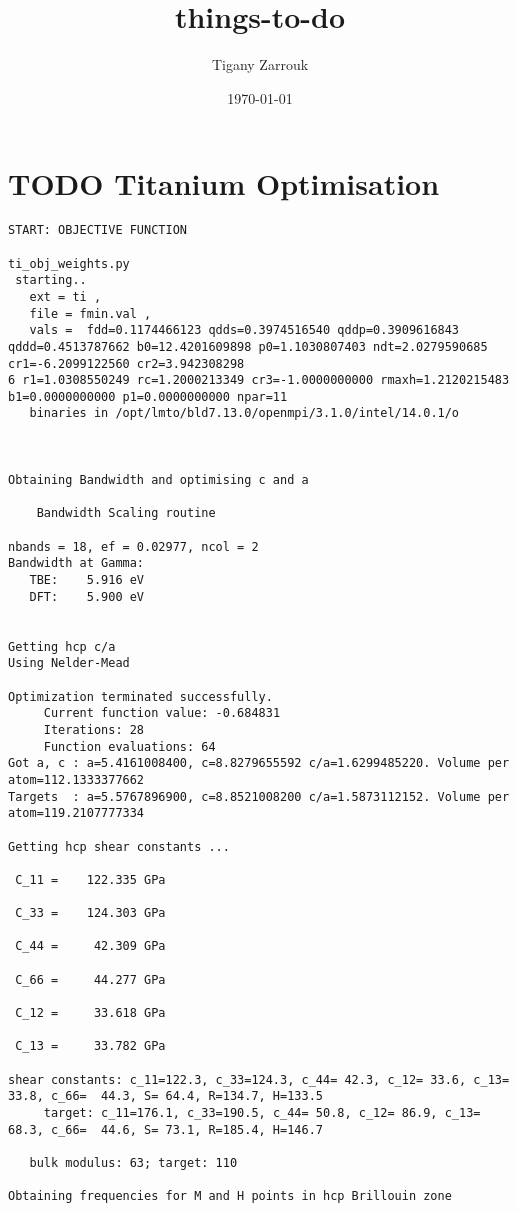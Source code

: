 \documentclass[11pt]{article}
\author{Tigany Zarrouk}
\date{\today}
\title{things-to-do}
\begin{document}
\maketitle
\tableofcontents

\section{{\bfseries\sffamily TODO} Titanium Optimisation}
\label{sec:org6e31f0f}
\begin{verbatim}
START: OBJECTIVE FUNCTION

ti_obj_weights.py 
 starting..
   ext = ti ,
   file = fmin.val ,
   vals =  fdd=0.1174466123 qdds=0.3974516540 qddp=0.3909616843 qddd=0.4513787662 b0=12.4201609898 p0=1.1030807403 ndt=2.0279590685 cr1=-6.2099122560 cr2=3.942308298
6 r1=1.0308550249 rc=1.2000213349 cr3=-1.0000000000 rmaxh=1.2120215483 b1=0.0000000000 p1=0.0000000000 npar=11  
   binaries in /opt/lmto/bld7.13.0/openmpi/3.1.0/intel/14.0.1/o



Obtaining Bandwidth and optimising c and a 

    Bandwidth Scaling routine 

nbands = 18, ef = 0.02977, ncol = 2
Bandwidth at Gamma:
   TBE:    5.916 eV
   DFT:    5.900 eV


Getting hcp c/a 
Using Nelder-Mead

Optimization terminated successfully.
	 Current function value: -0.684831
	 Iterations: 28
	 Function evaluations: 64
Got a, c : a=5.4161008400, c=8.8279655592 c/a=1.6299485220. Volume per atom=112.1333377662
Targets  : a=5.5767896900, c=8.8521008200 c/a=1.5873112152. Volume per atom=119.2107777334

Getting hcp shear constants ...

 C_11 =    122.335 GPa

 C_33 =    124.303 GPa

 C_44 =     42.309 GPa

 C_66 =     44.277 GPa

 C_12 =     33.618 GPa

 C_13 =     33.782 GPa

shear constants: c_11=122.3, c_33=124.3, c_44= 42.3, c_12= 33.6, c_13= 33.8, c_66=  44.3, S= 64.4, R=134.7, H=133.5 
	 target: c_11=176.1, c_33=190.5, c_44= 50.8, c_12= 86.9, c_13= 68.3, c_66=  44.6, S= 73.1, R=185.4, H=146.7 

   bulk modulus: 63; target: 110 

Obtaining frequencies for M and H points in hcp Brillouin zone


\end{verbatim}
\end{document}
